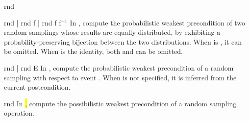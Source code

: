 \begin{tactic}{rnd}
  \begin{tsyntax}{rnd | rnd f | rnd f f$^{-1}$}
  In \prhl, compute the probabilistic weakest precondition of two
  random samplings whose results are equally distributed, by
  exhibiting a probability-preserving bijection between the two
  distributions. When  is , it can be
  omitted. When  is the identity, both  and
   can be omitted.
  \end{tsyntax}

  \begin{tsyntax}{rnd | rnd E}
  In \phl, compute the probabilistic weakest precondition of a random
  sampling with respect to event . When  is not
  specified, it is inferred from the current postcondition.
  \end{tsyntax}

  \begin{tsyntax}{rnd}
  In \hl, compute the possibilistic weakest precondition of a random
  sampling operation.
  \end{tsyntax}
\end{tactic}
